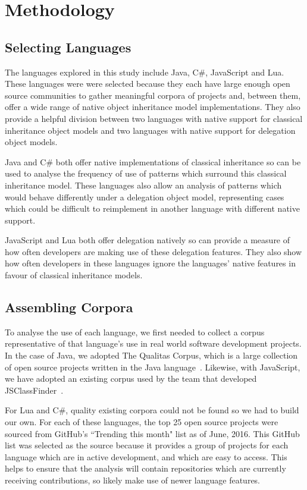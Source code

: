 \chapter{Methodology}\label{C:method} 

\section{Selecting Languages}
The languages explored in this study include Java, C\#, JavaScript and Lua. These languages were were selected because they each have large enough open source communities to gather meaningful corpora of projects and, between them, offer a wide range of native object inheritance model implementations. They also provide a helpful division between two languages with native support for classical inheritance object models and two languages with native support for delegation object models.
\newline

Java and C\# both offer native implementations of classical inheritance so can be used to analyse the frequency of use of patterns which surround this classical inheritance model. These languages also allow an analysis of patterns which would behave differently under a delegation object model, representing cases which could be difficult to reimplement in another language with different native support.
\newline

JavaScript and Lua both offer delegation natively so can provide a measure of how often developers are making use of these delegation features. They also show how often developers in these languages ignore the languages' native features in favour of classical inheritance models.

\section{Assembling Corpora}
To analyse the use of each language, we first needed to collect a corpus representative of that language's use in real world software development projects. In the case of Java, we adopted The Qualitas Corpus, which is a large collection of open source projects written in the Java language~\cite{QualitasCorpus}. Likewise, with JavaScript, we have adopted an existing corpus used by the team that developed JSClassFinder~\cite{JSClassFinder}.
\newline

For Lua and C\#, quality existing corpora could not be found so we had to build our own. For each of these languages, the top 25 open source projects were sourced from GitHub's ``Trending this month" list as of June, 2016. This GitHub list was selected as the source because it provides a group of projects for each language which are in active development, and which are easy to access. This helps to ensure that the analysis will contain repositories which are currently receiving contributions, so likely make use of newer language features.

